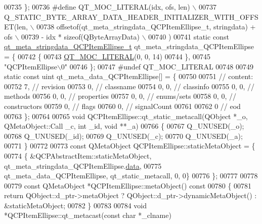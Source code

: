 \begin{DoxyCode}
00735 \};
00736 \textcolor{preprocessor}{#define QT\_MOC\_LITERAL(idx, ofs, len) \(\backslash\)}
00737 \textcolor{preprocessor}{    Q\_STATIC\_BYTE\_ARRAY\_DATA\_HEADER\_INITIALIZER\_WITH\_OFFSET(len, \(\backslash\)}
00738 \textcolor{preprocessor}{    offsetof(qt\_meta\_stringdata\_QCPItemEllipse\_t, stringdata) + ofs \(\backslash\)}
00739 \textcolor{preprocessor}{        - idx * sizeof(QByteArrayData) \(\backslash\)}
00740 \textcolor{preprocessor}{    )}
00741 \textcolor{keyword}{static} \textcolor{keyword}{const} \hyperlink{a00016_df/d98/a00107}{qt\_meta\_stringdata\_QCPItemEllipse\_t} 
      qt\_meta\_stringdata\_QCPItemEllipse = \{
00742     \{
00743 \hyperlink{a00016_a75bb9482d242cde0a06c9dbdc6b83abe}{QT\_MOC\_LITERAL}(0, 0, 14)
00744     \},
00745     \textcolor{stringliteral}{"QCPItemEllipse\(\backslash\)0"}
00746 \};
00747 \textcolor{preprocessor}{#undef QT\_MOC\_LITERAL}
00748 
00749 \textcolor{keyword}{static} \textcolor{keyword}{const} uint qt\_meta\_data\_QCPItemEllipse[] = \{
00750 
00751  \textcolor{comment}{// content:}
00752        7,       \textcolor{comment}{// revision}
00753        0,       \textcolor{comment}{// classname}
00754        0,    0, \textcolor{comment}{// classinfo}
00755        0,    0, \textcolor{comment}{// methods}
00756        0,    0, \textcolor{comment}{// properties}
00757        0,    0, \textcolor{comment}{// enums/sets}
00758        0,    0, \textcolor{comment}{// constructors}
00759        0,       \textcolor{comment}{// flags}
00760        0,       \textcolor{comment}{// signalCount}
00761 
00762        0        \textcolor{comment}{// eod}
00763 \};
00764 
00765 \textcolor{keywordtype}{void} QCPItemEllipse::qt\_static\_metacall(QObject *\_o, QMetaObject::Call \_c, \textcolor{keywordtype}{int} \_id, \textcolor{keywordtype}{void} **\_a)
00766 \{
00767     Q\_UNUSED(\_o);
00768     Q\_UNUSED(\_id);
00769     Q\_UNUSED(\_c);
00770     Q\_UNUSED(\_a);
00771 \}
00772 
00773 \textcolor{keyword}{const} QMetaObject QCPItemEllipse::staticMetaObject = \{
00774     \{ &QCPAbstractItem::staticMetaObject, qt\_meta\_stringdata\_QCPItemEllipse.\hyperlink{a00016_a7efd0687e2b0fbd2c4df25855b74af30}{data},
00775       qt\_meta\_data\_QCPItemEllipse,  qt\_static\_metacall, 0, 0\}
00776 \};
00777 
00778 
00779 \textcolor{keyword}{const} QMetaObject *QCPItemEllipse::metaObject()\textcolor{keyword}{ const}
00780 \textcolor{keyword}{}\{
00781     \textcolor{keywordflow}{return} QObject::d\_ptr->metaObject ? QObject::d\_ptr->dynamicMetaObject() : &staticMetaObject;
00782 \}
00783 
00784 \textcolor{keywordtype}{void} *QCPItemEllipse::qt\_metacast(\textcolor{keyword}{const} \textcolor{keywordtype}{char} *\_clname)

\end{DoxyCode}
